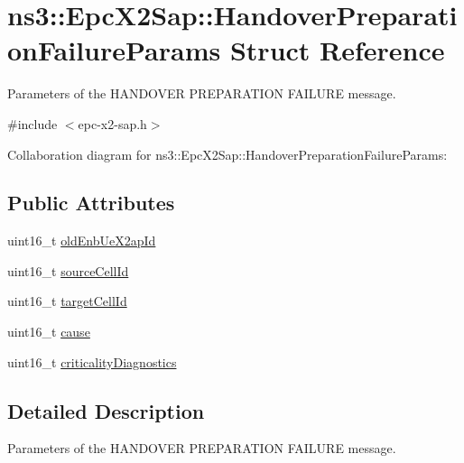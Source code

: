 \hypertarget{structns3_1_1EpcX2Sap_1_1HandoverPreparationFailureParams}{}\section{ns3\+:\+:Epc\+X2\+Sap\+:\+:Handover\+Preparation\+Failure\+Params Struct Reference}
\label{structns3_1_1EpcX2Sap_1_1HandoverPreparationFailureParams}


Parameters of the H\+A\+N\+D\+O\+V\+ER P\+R\+E\+P\+A\+R\+A\+T\+I\+ON F\+A\+I\+L\+U\+RE message.  




{\ttfamily \#include $<$epc-\/x2-\/sap.\+h$>$}



Collaboration diagram for ns3\+:\+:Epc\+X2\+Sap\+:\+:Handover\+Preparation\+Failure\+Params\+:
\subsection*{Public Attributes}
\begin{DoxyCompactItemize}
\item 
uint16\+\_\+t \hyperlink{structns3_1_1EpcX2Sap_1_1HandoverPreparationFailureParams_ab0e0e69bca8943f423ea73a473f559a2}{old\+Enb\+Ue\+X2ap\+Id}
\item 
uint16\+\_\+t \hyperlink{structns3_1_1EpcX2Sap_1_1HandoverPreparationFailureParams_af23c597a42726f30008b0c4bdb16c3dc}{source\+Cell\+Id}
\item 
uint16\+\_\+t \hyperlink{structns3_1_1EpcX2Sap_1_1HandoverPreparationFailureParams_a9396b05fdb6d38db8c9e9fd381c45448}{target\+Cell\+Id}
\item 
uint16\+\_\+t \hyperlink{structns3_1_1EpcX2Sap_1_1HandoverPreparationFailureParams_abb25facf6dd44b25fc01751dce3e5b0d}{cause}
\item 
uint16\+\_\+t \hyperlink{structns3_1_1EpcX2Sap_1_1HandoverPreparationFailureParams_a05d186e452806de2ff8dc51f0ad4fd50}{criticality\+Diagnostics}
\end{DoxyCompactItemize}


\subsection{Detailed Description}
Parameters of the H\+A\+N\+D\+O\+V\+ER P\+R\+E\+P\+A\+R\+A\+T\+I\+ON F\+A\+I\+L\+U\+RE message. 


